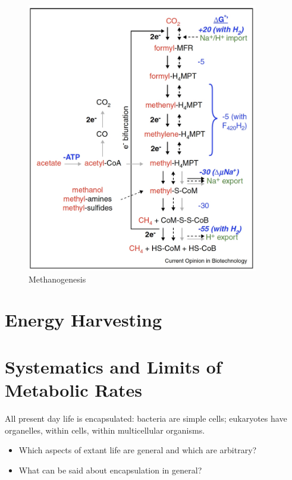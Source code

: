 \documentclass[]{article}
\begin{document}
\begin{figure}[H]
	\caption{Methanogenesis} \label{fig:Methanogenesis} 
	\includegraphics[width=0.9\textwidth]{Methanogenesis}
\end{figure}

\section{Energy Harvesting}

\cite{simon2008organisation}

\section{Systematics and Limits of Metabolic Rates}

All present day life is encapsulated: bacteria are simple cells; eukaryotes have organelles, within cells, within multicellular organisms.
\begin{itemize}
	\item Which aspects of extant life are general and 	which are arbitrary?
	\item What can be said about encapsulation in general?
\end{itemize}

\printglossaries

 


\end{document}

